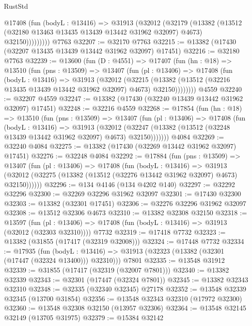 \begin{lexlean}{RustStd}
\begin{coremodule}
            @17408
              (fun (bodyL : @13416) =>
              @31913
                (@32012
                  (@32179
                    (@13382
                      (@13512 (@32180 @13463 @13435 @13439 @13442 @31962 @32097) @4673)
                      @32150)))))))))
    @7763
@32207 := @32170 @7763
@32215 := @13382 (@17430 (@32207 @13435 @13439 @13442 @31962 @32097) @17451)
@32216 := @32180 @7763
@32239 := @13600
    (fun (D : @4551) =>
    @17407
      (fun (hn : @18) =>
      @13510
        (fun (pns : @13509) =>
        @13407
          (fun (pl : @13406) =>
          @17408
            (fun (bodyL : @13416) =>
            @31913
              (@32012
                (@32215
                  (@13382 (@13512 (@32216 @13435 @13439 @13442 @31962 @32097) @4673) @32150))))))))
    @4559
@32240 := @32207 @4559
@32247 := @13382 (@17430 (@32240 @13439 @13442 @31962 @32097) @17451)
@32248 := @32216 @4559
@32268 := @17854
    (fun (hn : @18) =>
    @13510
      (fun (pns : @13509) =>
      @13407
        (fun (pl : @13406) =>
        @17408
          (fun (bodyL : @13416) =>
          @31913
            (@32012
              (@32247 (@13382 (@13512 (@32248 @13439 @13442 @31962 @32097) @4673) @32150)))))))
    @4084
@32269 := @32240 @4084
@32275 := @13382 (@17430 (@32269 @13442 @31962 @32097) @17451)
@32276 := @32248 @4084
@32292 := @17884
    (fun (pns : @13509) =>
    @13407
      (fun (pl : @13406) =>
      @17408
        (fun (bodyL : @13416) =>
        @31913 (@32012 (@32275 (@13382 (@13512 (@32276 @13442 @31962 @32097) @4673) @32150))))))
@32296 := @134 @4146 (@134 @4202 @140)
@32297 := @32292 @32296
@32300 := @32269 @32296 @31962 @32097
@32301 := @17430 @32300
@32303 := @13382 (@32301 @17451)
@32306 := @32276 @32296 @31962 @32097
@32308 := @13512 @32306 @4673
@32310 := @13382 @32308 @32150
@32318 := @13597
    (fun (pl : @13406) => @17408 (fun (bodyL : @13416) => @31913 (@32012 (@32303 @32310))))
    @7732
@32319 := @17418 @7732
@32323 := @13382 (@31855 (@17417 (@32319 @32008)))
@32324 := @17448 @7732
@32334 := @17935
    (fun (bodyL : @13416) => @31913 (@32323 (@13382 (@32301 (@17447 (@32324 @13400))) @32310)))
    @7801
@32335 := @13548 @31912
@32339 := @31855 (@17417 (@32319 (@32007 @7801)))
@32340 := @13382 @32339
@32343 := @32301 (@17447 (@32324 @7801))
@32345 := @13382 @32343 @32310
@32348 := @32335 (@32340 @32345) @27178
@32352 := @13548 @32339 @32345 (@13700 @31854)
@32356 := @13548 @32343 @32310 (@17972 @32300)
@32360 := @13548 @32308 @32150 (@13957 @32306)
@32364 := @13548 @32145 @32149 (@13705 @31975)
@32379 := @15384
    @32142

\end{coremodule}
\end{lexlean}
